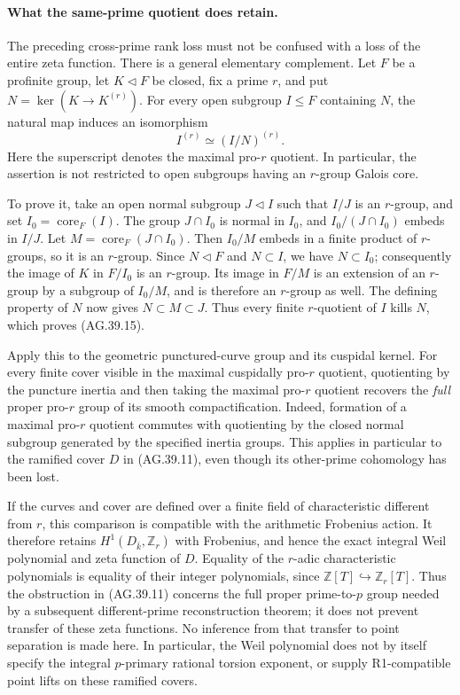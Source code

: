 \paragraph{What the same-prime quotient does retain.}
The preceding cross-prime rank loss must not be confused
with a loss of the entire zeta function. There is a general
elementary complement. Let \(F\) be a profinite group,
let \(K\triangleleft F\) be closed, fix a prime \(r\),
and put \(N=\ker(K\to K^{(r)})\). For every open
subgroup \(I\leq F\) containing \(N\), the natural map
induces an isomorphism
\[
                         I^{(r)}\simeq (I/N)^{(r)}.
                                                        \tag{AG.39.15}
\]
Here the superscript denotes the maximal pro-\(r\)
quotient. In particular, the assertion is not restricted
to open subgroups having an \(r\)-group Galois core.

To prove it, take an open normal subgroup \(J\triangleleft I\)
such that \(I/J\) is an \(r\)-group, and set
\(I_0=\operatorname{core}_F(I)\).
The group \(J\cap I_0\) is normal in \(I_0\), and
\(I_0/(J\cap I_0)\) embeds in \(I/J\).
Let \(M=\operatorname{core}_F(J\cap I_0)\).
Then \(I_0/M\) embeds in a finite product of
\(r\)-groups, so it is an \(r\)-group. Since
\(N\triangleleft F\) and \(N\subset I\), we have
\(N\subset I_0\); consequently the image of \(K\)
in \(F/I_0\) is an \(r\)-group. Its image in
\(F/M\) is an extension of an \(r\)-group by a
subgroup of \(I_0/M\), and is therefore an
\(r\)-group as well. The defining property of \(N\)
now gives \(N\subset M\subset J\). Thus every
finite \(r\)-quotient of \(I\) kills \(N\),
which proves (AG.39.15).

Apply this to the geometric punctured-curve group and
its cuspidal kernel. For every finite cover visible in
the maximal cuspidally pro-\(r\) quotient, quotienting
by the puncture inertia and then taking the maximal
pro-\(r\) quotient recovers the \emph{full} proper
pro-\(r\) group of its smooth compactification.
Indeed, formation of a maximal pro-\(r\) quotient
commutes with quotienting by the closed normal subgroup
generated by the specified inertia groups. This applies
in particular to the ramified cover \(D\) in
(AG.39.11), even though its other-prime cohomology has
been lost.

If the curves and cover are defined over a finite field
of characteristic different from \(r\), this comparison
is compatible with the arithmetic Frobenius action.
It therefore retains \(H^1(D_{\bar k},\mathbb Z_r)\)
with Frobenius, and hence the exact integral Weil
polynomial and zeta function of \(D\). Equality of the
\(r\)-adic characteristic polynomials is equality of
their integer polynomials, since
\(\mathbb Z[T]\hookrightarrow\mathbb Z_r[T]\).
Thus the obstruction in (AG.39.11) concerns the full
proper prime-to-\(p\) group needed by a subsequent
different-prime reconstruction theorem; it does not
prevent transfer of these zeta functions. No inference
from that transfer to point separation is made here.
In particular, the Weil polynomial does not by itself
specify the integral \(p\)-primary rational torsion
exponent, or supply R1-compatible point lifts on these
ramified covers.
